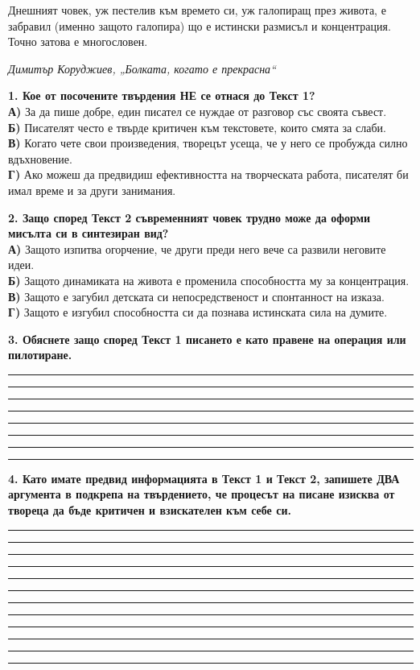 \documentclass[12pt,a4paper]{article}
\begin{document}
Днешният човек, уж пестелив към времето си, уж галопиращ през живота, е забравил (именно защото галопира) що е истински размисъл и концентрация. Точно затова е многословен.

\vspace{0.2cm}
\hfill \textit{Димитър Коруджиев, „Болката, когато е прекрасна“}

\vspace{0.6cm}

\noindent
\textbf{1. Кое от посочените твърдения НЕ се отнася до Текст 1?} \\
\textbf{А)} За да пише добре, един писател се нуждае от разговор със своята съвест. \\
\textbf{Б)} Писателят често е твърде критичен към текстовете, които смята за слаби. \\
\textbf{В)} Когато чете свои произведения, творецът усеща, че у него се пробужда силно вдъхновение. \\
\textbf{Г)} Ако можеш да предвидиш ефективността на творческата работа, писателят би имал време и за други занимания.

\vspace{0.6cm}

\noindent
\textbf{2. Защо според Текст 2 съвременният човек трудно може да оформи мисълта си в синтезиран вид?} \\
\textbf{А)} Защото изпитва огорчение, че други преди него вече са развили неговите идеи. \\
\textbf{Б)} Защото динамиката на живота е променила способността му за концентрация. \\
\textbf{В)} Защото е загубил детската си непосредственост и спонтанност на изказа. \\
\textbf{Г)} Защото е изгубил способността си да познава истинската сила на думите.

\vspace{0.6cm}

\noindent
\textbf{3. Обяснете защо според Текст 1 писането е като правене на операция или пилотиране.}
\noindent\rule{\linewidth}{0.4pt}
\noindent\rule{\linewidth}{0.4pt}
\noindent\rule{\linewidth}{0.4pt}
\noindent\rule{\linewidth}{0.4pt}
\noindent\rule{\linewidth}{0.4pt}
\noindent\rule{\linewidth}{0.4pt}
\noindent\rule{\linewidth}{0.4pt}
\noindent\rule{\linewidth}{0.4pt}

\vspace{0.6cm}

\noindent
\textbf{4. Като имате предвид информацията в Текст 1 и Текст 2, запишете ДВА аргумента в подкрепа на твърдението, че процесът на писане изисква от твореца да бъде критичен и взискателен към себе си.}
\noindent\rule{\linewidth}{0.4pt}
\noindent\rule{\linewidth}{0.4pt}
\noindent\rule{\linewidth}{0.4pt}
\noindent\rule{\linewidth}{0.4pt}
\noindent\rule{\linewidth}{0.4pt}
\noindent\rule{\linewidth}{0.4pt}
\noindent\rule{\linewidth}{0.4pt}
\noindent\rule{\linewidth}{0.4pt}
\noindent\rule{\linewidth}{0.4pt}
\noindent\rule{\linewidth}{0.4pt}
\noindent\rule{\linewidth}{0.4pt}
\noindent\rule{\linewidth}{0.4pt}
\end{document}
